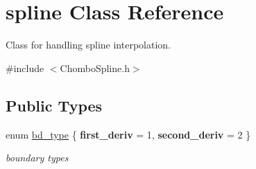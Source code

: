 \hypertarget{classspline}{}\section{spline Class Reference}
\label{classspline}


Class for handling spline interpolation.  




{\ttfamily \#include $<$Chombo\+Spline.\+h$>$}

\subsection*{Public Types}
\begin{DoxyCompactItemize}
\item 
\mbox{\label{classspline_a4e92a172f86289ee7171a07f1bdbf562}} 
enum \hyperlink{classspline_a4e92a172f86289ee7171a07f1bdbf562}{bd\+\_\+type} \{ {\bfseries first\+\_\+deriv} = 1, 
{\bfseries second\+\_\+deriv} = 2
 \}\begin{DoxyCompactList}\small\item\em boundary types \end{DoxyCompactList}
\end{DoxyCompactItemize}
